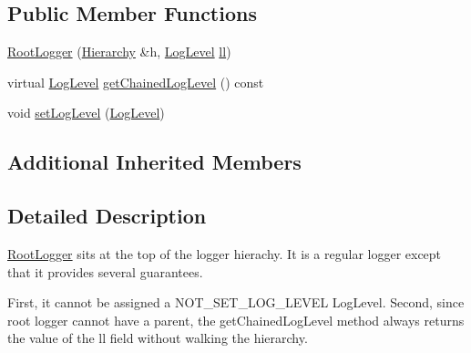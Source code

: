 \subsection*{Public Member Functions}
\begin{DoxyCompactItemize}
\item 
\hyperlink{classlog4cplus_1_1spi_1_1RootLogger_ab5d4b2ef82a159579dd6332bd44bfd33}{Root\-Logger} (\hyperlink{classlog4cplus_1_1Hierarchy}{Hierarchy} \&h, \hyperlink{namespacelog4cplus_abd332cc8c98fefcbbdcf57b6b3867de9}{Log\-Level} \hyperlink{classlog4cplus_1_1spi_1_1LoggerImpl_a8a3672445f1145629a59e27655c480c4}{ll})
\item 
virtual \hyperlink{namespacelog4cplus_abd332cc8c98fefcbbdcf57b6b3867de9}{Log\-Level} \hyperlink{classlog4cplus_1_1spi_1_1RootLogger_a96fc887f88935bd275db3f5a01a4c821}{get\-Chained\-Log\-Level} () const 
\item 
void \hyperlink{classlog4cplus_1_1spi_1_1RootLogger_a46dc8f909d097b0eccd7942bec1bb3aa}{set\-Log\-Level} (\hyperlink{namespacelog4cplus_abd332cc8c98fefcbbdcf57b6b3867de9}{Log\-Level})
\end{DoxyCompactItemize}
\subsection*{Additional Inherited Members}


\subsection{Detailed Description}
\hyperlink{classlog4cplus_1_1spi_1_1RootLogger}{Root\-Logger} sits at the top of the logger hierachy. It is a regular logger except that it provides several guarantees.

First, it cannot be assigned a {\ttfamily N\-O\-T\-\_\-\-S\-E\-T\-\_\-\-L\-O\-G\-\_\-\-L\-E\-V\-E\-L} Log\-Level. Second, since root logger cannot have a parent, the get\-Chained\-Log\-Level method always returns the value of the ll field without walking the hierarchy. 

